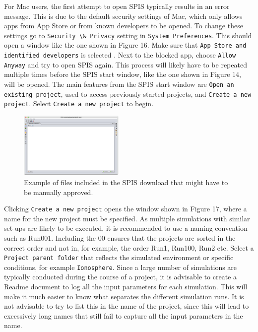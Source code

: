 \documentclass[a4paper, 11pt]{article}
\begin{document}
For Mac users, the first attempt to open SPIS typically results in an error message. This is due to the default security settings of Mac, which only allows apps from App Store or from known developers to be opened. To change these settings go to \verb|Security \& Privacy| setting in \verb|System Preferences|. This should open a window like the one shown in Figure 16. Make sure that \verb|App Store and identified developers| is selected . Next to the blocked app, choose \verb|Allow Anyway| and try to open SPIS again. This process will likely have to be repeated multiple times before the SPIS start window, like the one shown in Figure 14, will be opened. The main features from the SPIS start window are \verb|Open an existing project|, used to access previously started projects, and \verb|Create a new project|. Select \verb|Create a new project| to begin.

\begin{figure}[!ht]
    \centering
    \includegraphics[width=0.45\textwidth]{fig16.jpg}
    \caption{Example of files included in the SPIS download that might have to be manually approved.}
\end{figure}

Clicking \verb|Create a new project| opens the window shown in Figure 17, where a name for the new project must be specified. As multiple simulations with similar set-ups are likely to be executed, it is recommended to use a naming convention such as Run001. Including the 00 ensures that the projects are sorted in the correct order and not in, for example, the order Run1, Run100, Run2 etc. Select a \verb|Project parent folder| that reflects the simulated environment or specific conditions, for example \verb|Ionosphere|. Since a large number of simulations are typically conducted during the course of a project, it is advisable to create a Readme document to log all the input parameters for each simulation. This will make it much easier to know what separates the different simulation runs. It is not advisable to try to list this in the name of the project, since this will lead to excessively long names that still fail to capture all the input parameters in the name.
\end{document}
